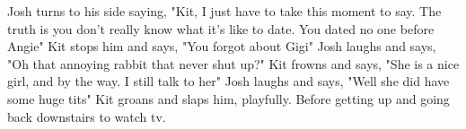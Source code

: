 \documentclass{article}[12px] %
\begin{document}
Josh turns to his side saying, "Kit, I just have to take this moment to say. The truth is you don't really know what it's like to date. You dated no one before Angie" Kit stops him and says, "You forgot about Gigi" Josh laughs and says, "Oh that annoying rabbit that never shut up?" Kit frowns and says, "She is a nice girl, and by the way. I still talk to her" Josh laughs and says, "Well she did have some huge tits" Kit groans and slaps him, playfully. Before getting up and going back downstairs to watch tv.
\end{document}
